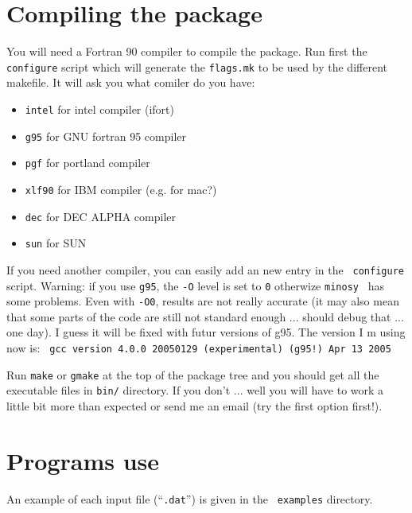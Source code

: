 \documentclass[11pt]{article}
\begin{document}
\section{Compiling the package}
You will need a Fortran 90 compiler to compile the package.
Run first the {\tt configure} script which will generate the
{\tt flags.mk} to be used by the different makefile.
It will ask you  what comiler do you have:
\begin{itemize}	
\item {\tt intel} for intel compiler (ifort)
\item {\tt  g95}  for GNU fortran 95 compiler 
\item{\tt pgf} for portland compiler
\item{\tt xlf90} for IBM compiler (e.g. for mac?)
\item{\tt dec} for DEC ALPHA compiler
\item{\tt sun} for SUN
\end{itemize}	
 If you need
another compiler, you can easily add an new entry in the {\tt
configure} script. Warning: if you use {\tt g95}, the {\tt -O} level
is set to {\tt 0} otherwize {\tt minosy }
has some problems. Even with {\tt -O0}, results are not really
accurate (it may also mean that some parts of the code are still not
standard enough ... should debug that ... one day). I guess it will be
fixed with futur versions of g95. The version I m using now is: {\tt
gcc version 4.0.0 20050129 (experimental)   (g95!) Apr 13 2005}

Run {\tt make} or {\tt gmake} at the top
of the package tree and you should get all the executable files
in {\tt bin/} directory. If you don't ... well you will have to work 
a little bit more than expected or send me an email (try the first
option first!).

\section{Programs use}
An example of each input file (``{\tt .dat}'') is given in the {\tt
examples} directory.
\end{document}
